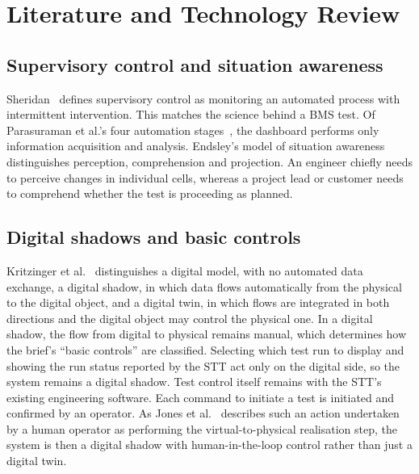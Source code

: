 \section{Literature and Technology Review}
\label{sec:literature}

\subsection{Supervisory control and situation awareness}\label{subsec:supervisory-control-and-situation-awareness}
Sheridan~\cite{sheridan1992telerobotics} defines supervisory control as monitoring an automated process with intermittent intervention.
This matches the science behind a BMS test.
Of Parasuraman et al.'s four automation stages~\cite{parasuraman2000model}, the dashboard performs only information acquisition and analysis.
Endsley's model of situation awareness~\cite{endsley1995toward} distinguishes perception, comprehension and projection.
An engineer chiefly needs to perceive changes in individual cells, whereas a project lead or customer needs to comprehend whether the test is proceeding as planned.

\subsection{Digital shadows and basic controls}\label{subsec:digital-twins}
Kritzinger et al.~\cite{kritzinger2018digital} distinguishes a digital model, with no automated data exchange, a digital shadow, in which data flows automatically from the physical to the digital object, and a digital twin, in which flows are integrated in both directions and the digital object may control the physical one.
In a digital shadow, the flow from digital to physical remains manual, which determines how the brief's ``basic controls'' are classified.
Selecting which test run to display and showing the run status reported by the STT act only on the digital side, so the system remains a digital shadow.
Test control itself remains with the STT's existing engineering software.
Each command to initiate a test is initiated and confirmed by an operator.
As Jones et al.~\cite{jones2020characterising} describes such an action undertaken by a human operator as performing the virtual-to-physical realisation step, the system is then a digital shadow with human-in-the-loop control rather than just a digital twin.

